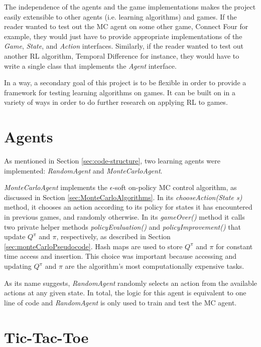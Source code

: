 \documentclass[11pt,a4paper]{report}
\begin{document}
The independence of the agents and the game implementations makes the project easily extensible to other agents (i.e. learning algorithms) and games. If the reader wanted to test out the MC agent on some other game, Connect Four for example, they would just have to provide appropriate implementations of the \emph{Game}, \emph{State}, and \emph{Action} interfaces. Similarly, if the reader wanted to test out another RL algorithm, Temporal Difference for instance, they would have to  write a single class that implements the \emph{Agent} interface.

In a way, a secondary goal of this project is to be flexible in order to provide a framework for testing learning algorithms on games. It can be built on in a variety of ways in order to do further research on applying RL to games.


\section{Agents}
\label{sec:Agents}

As mentioned in Section \ref{sec:code-structure}, two learning agents were implemented: \emph{RandomAgent} and \emph{MonteCarloAgent}.

\emph{MonteCarloAgent} implements the $\epsilon$-soft on-policy MC control algorithm, as discussed in Section \ref{sec:MonteCarloAlgorithms}. In its \emph{chooseAction(State s)} method, it chooses an action according to its policy for states it has encountered in previous games, and randomly otherwise. In its \emph{gameOver()} method it calls two private helper methods \emph{policyEvaluation()} and \emph{policyImprovement()} that update $Q^{\pi}$ and $\pi$, respectively, as described in Section \ref{sec:monteCarloPseudocode}. Hash maps are used to store $Q^{\pi}$ and $\pi$ for constant time access and insertion. This choice was important because accessing and updating $Q^{\pi}$ and $\pi$ are the algorithm's most computationally expensive tasks.

As its name suggests, \emph{RandomAgent} randomly selects an action from the available actions at any given state. In total, the logic for this agent is equivalent to one line of code and \emph{RandomAgent} is only used to train and test the MC agent.


\section{Tic-Tac-Toe}
\label{sec:TicTacToe}
\end{document}

